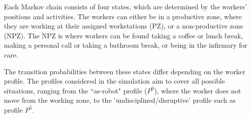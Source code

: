 \documentclass[review,12pt, 3p, times]{elsarticle}
\begin{document}
Each Markov chain consists of four states, which are determined by the workers' positions and activities. The workers can either be in a productive zone, where they are working at their assigned workstations (PZ), or a non-productive zone (NPZ). The NPZ is where workers can be found taking a coffee or lunch break, making a personal call or taking a bathroom break, or being in the infirmary for care.
	
The transition probabilities between these states differ depending on the worker profile. The profiles considered in the simulation aim to cover all possible situations, ranging from the “as-robot" profile ($P^0$), where the worker does not move from the working zone, to the 'undisciplined/disruptive' profile such as profile $P^5$. 
\end{document}
